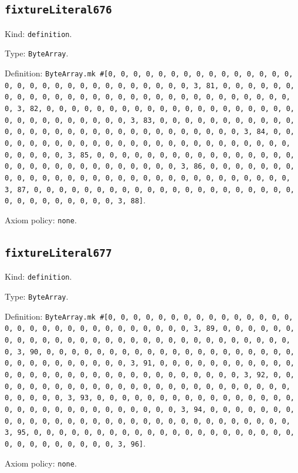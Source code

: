 \documentclass[11pt]{article}
\begin{document}
\subsection*{\texttt{fixtureLiteral676}}
\noindent Kind: \texttt{definition}.\par
\noindent Type: \texttt{ByteArray}.\par
\noindent Definition: \texttt{ByteArray.mk \#[0, 0, 0, 0, 0, 0, 0, 0, 0, 0, 0, 0, 0, 0, 0, 0, 0, 0, 0, 0, 0, 0, 0, 0, 0, 0, 0, 0, 0, 0, 3, 81, 0, 0, 0, 0, 0, 0, 0, 0, 0, 0, 0, 0, 0, 0, 0, 0, 0, 0, 0, 0, 0, 0, 0, 0, 0, 0, 0, 0, 0, 0, 3, 82, 0, 0, 0, 0, 0, 0, 0, 0, 0, 0, 0, 0, 0, 0, 0, 0, 0, 0, 0, 0, 0, 0, 0, 0, 0, 0, 0, 0, 0, 0, 3, 83, 0, 0, 0, 0, 0, 0, 0, 0, 0, 0, 0, 0, 0, 0, 0, 0, 0, 0, 0, 0, 0, 0, 0, 0, 0, 0, 0, 0, 0, 0, 3, 84, 0, 0, 0, 0, 0, 0, 0, 0, 0, 0, 0, 0, 0, 0, 0, 0, 0, 0, 0, 0, 0, 0, 0, 0, 0, 0, 0, 0, 0, 0, 3, 85, 0, 0, 0, 0, 0, 0, 0, 0, 0, 0, 0, 0, 0, 0, 0, 0, 0, 0, 0, 0, 0, 0, 0, 0, 0, 0, 0, 0, 0, 0, 3, 86, 0, 0, 0, 0, 0, 0, 0, 0, 0, 0, 0, 0, 0, 0, 0, 0, 0, 0, 0, 0, 0, 0, 0, 0, 0, 0, 0, 0, 0, 0, 3, 87, 0, 0, 0, 0, 0, 0, 0, 0, 0, 0, 0, 0, 0, 0, 0, 0, 0, 0, 0, 0, 0, 0, 0, 0, 0, 0, 0, 0, 0, 0, 3, 88]}.\par
\noindent Axiom policy: \texttt{none}.\par
\subsection*{\texttt{fixtureLiteral677}}
\noindent Kind: \texttt{definition}.\par
\noindent Type: \texttt{ByteArray}.\par
\noindent Definition: \texttt{ByteArray.mk \#[0, 0, 0, 0, 0, 0, 0, 0, 0, 0, 0, 0, 0, 0, 0, 0, 0, 0, 0, 0, 0, 0, 0, 0, 0, 0, 0, 0, 0, 0, 3, 89, 0, 0, 0, 0, 0, 0, 0, 0, 0, 0, 0, 0, 0, 0, 0, 0, 0, 0, 0, 0, 0, 0, 0, 0, 0, 0, 0, 0, 0, 0, 3, 90, 0, 0, 0, 0, 0, 0, 0, 0, 0, 0, 0, 0, 0, 0, 0, 0, 0, 0, 0, 0, 0, 0, 0, 0, 0, 0, 0, 0, 0, 0, 3, 91, 0, 0, 0, 0, 0, 0, 0, 0, 0, 0, 0, 0, 0, 0, 0, 0, 0, 0, 0, 0, 0, 0, 0, 0, 0, 0, 0, 0, 0, 0, 3, 92, 0, 0, 0, 0, 0, 0, 0, 0, 0, 0, 0, 0, 0, 0, 0, 0, 0, 0, 0, 0, 0, 0, 0, 0, 0, 0, 0, 0, 0, 0, 3, 93, 0, 0, 0, 0, 0, 0, 0, 0, 0, 0, 0, 0, 0, 0, 0, 0, 0, 0, 0, 0, 0, 0, 0, 0, 0, 0, 0, 0, 0, 0, 3, 94, 0, 0, 0, 0, 0, 0, 0, 0, 0, 0, 0, 0, 0, 0, 0, 0, 0, 0, 0, 0, 0, 0, 0, 0, 0, 0, 0, 0, 0, 0, 3, 95, 0, 0, 0, 0, 0, 0, 0, 0, 0, 0, 0, 0, 0, 0, 0, 0, 0, 0, 0, 0, 0, 0, 0, 0, 0, 0, 0, 0, 0, 0, 3, 96]}.\par
\noindent Axiom policy: \texttt{none}.\par
\end{document}
